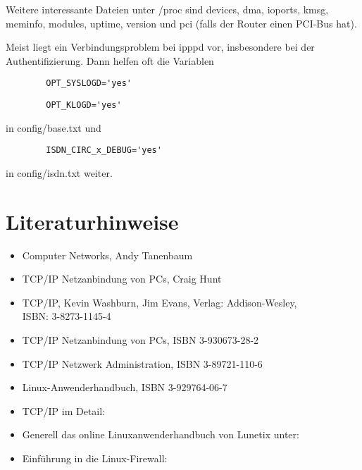     Weitere interessante Dateien unter /proc sind devices, dma,
    ioports, kmsg, meminfo, modules, uptime, version und pci (falls
    der Router einen PCI-Bus hat).
    
    Meist liegt ein Verbindungsproblem bei ipppd vor, insbesondere bei
    der Authentifizierung. Dann helfen oft die Variablen

\begin{example}
\begin{verbatim}
        OPT_SYSLOGD='yes'
\end{verbatim}
\end{example}

\begin{example}
\begin{verbatim}
        OPT_KLOGD='yes'
\end{verbatim}
\end{example}

    in config/base.txt und

\begin{example}
\begin{verbatim}
        ISDN_CIRC_x_DEBUG='yes'
\end{verbatim}
\end{example}

    in config/isdn.txt weiter.


    \section{Literaturhinweise}

    \begin{itemize}
    \item Computer Networks, Andy Tanenbaum
    \item TCP/IP Netzanbindung von PCs, Craig Hunt
    \item TCP/IP, Kevin Washburn, Jim Evans, Verlag: Addison-Wesley, \\ISBN: 3-8273-1145-4
    \item TCP/IP Netzanbindung von PCs, ISBN 3-930673-28-2
    \item TCP/IP Netzwerk Administration, ISBN 3-89721-110-6
    \item Linux-Anwenderhandbuch, ISBN 3-929764-06-7
    \item TCP/IP im Detail:\\
    \item Generell das online Linuxanwenderhandbuch von Lunetix unter:\\
    \item Einführung in die Linux-Firewall:
    \end{itemize}

